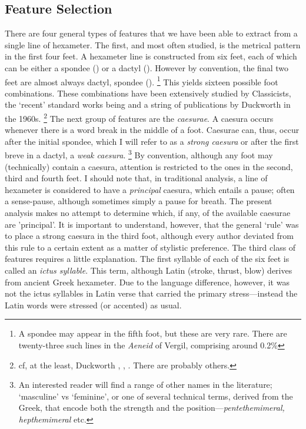 \documentclass[11pt,a4paper]{scrartcl} %
\begin{document}
{\subsection{Feature Selection}
There are four general types of features that we have been able to extract from a single line of hexameter. The first, and most often studied, is the metrical pattern in the first four feet. A hexameter line is constructed from six feet, each of which can be either a spondee (\metricsymbols{_ _}) or a dactyl (). However by convention, the final two feet are almost always dactyl, spondee ().%
\footnote{A spondee may appear in the fifth foot, but these are very rare. There are twenty-three such lines in the \textit{Aeneid} of Vergil, comprising around 0.2\%}
This yields sixteen possible foot combinations. These combinations have been extensively studied by Classicists, the `recent' standard works being \cite{platnauer_1951} and a string of publications by Duckworth in the 1960s.%
\footnote{cf, at the least, Duckworth \citeyear{duckworth_horaces_1965}, \citeyear{duckworth_five_1967}, \citeyear{duckworth_maphaeus_1969} \citeyear{duckworth_vergil_1969}. There are probably others.}
The next group of features are the \textit{caesurae}. A caesura occurs whenever there is a word break in the middle of a foot. Caesurae can, thus, occur after the initial spondee, which I will refer to as a \textit{strong caesura} or after the first breve in a dactyl, a \textit{weak caesura}.%
\footnote{An interested reader will find a range of other names in the literature; `masculine' vs `feminine', or one of several technical terms, derived from the Greek, that encode both the strength and the position---\textit{pentethemimeral, hepthemimeral} etc.}
By convention, although any foot may (technically) contain a caesura, attention is restricted to the ones in the second, third and fourth feet. I should note that, in traditional analysis, a line of hexameter is considered to have a \textit{principal} caesura, which entails a pause; often a sense-pause, although sometimes simply a pause for breath. The present analysis makes no attempt to determine which, if any, of the available caesurae are 'principal'. It is important to understand, however, that the general `rule' was to place a strong caesura in the third foot, although every author deviated from this rule to a certain extent as a matter of stylistic preference. The third class of features requires a little explanation. The first syllable of each of the six feet is called an \textit{ictus syllable}. This term, although Latin (stroke, thrust, blow) derives from ancient Greek hexameter. Due to the language difference, however, it was not the ictus syllables in Latin verse that carried the primary stress---instead the Latin words were stressed (or accented) as usual.%
}
\end{document}
